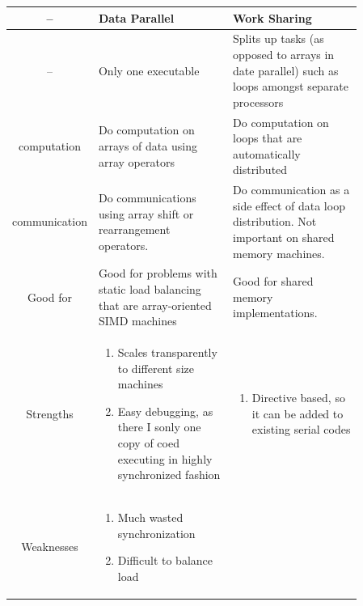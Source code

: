 \documentclass[12pt, a4paper]{book}
\begin{document}
\begin{longtable}{|c|p{0.43\linewidth}|p{0.43\linewidth}|}
    \hline
    --            & \textbf{Data Parallel}                                                                           & \textbf{Work Sharing}                                                                                 \\
    \hline
    --            & Only one executable                                                                              & Splits up tasks (as opposed to arrays in date parallel) such as loops amongst separate processors     \\
    \hline
    computation   & Do computation on arrays of data using array operators                                           & Do computation on loops that are automatically distributed                                            \\
    \hline
    communication & Do communications using array shift or rearrangement operators.                                  & Do communication as a side effect of data loop distribution. Not important on shared memory machines. \\
    \hline
    Good for      & Good for problems with static load balancing that are array-oriented SIMD machines               & Good for shared memory implementations.                                                               \\
    \hline
    Strengths     & \begin{enumerate}
                        \item Scales transparently to different size machines
                        \item Easy debugging, as there I sonly one copy of coed executing in highly synchronized fashion
                    \end{enumerate} & \begin{enumerate}
                                          \item Directive based, so it can be added to existing serial codes
                                      \end{enumerate}                                                                                                          \\
    \hline
    Weaknesses    & \begin{enumerate}
                        \item Much wasted synchronization
                        \item Difficult to balance load

\end{enumerate}
\end{longtable}
\end{document}
